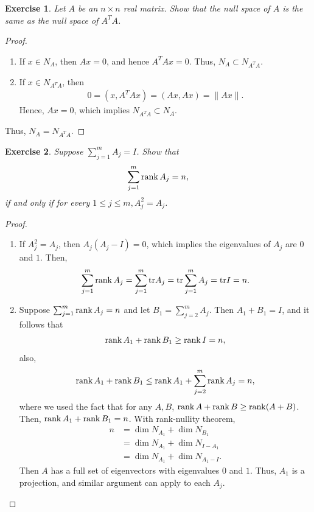 \documentclass[11pt]{book}
\newtheorem{exercise}{Exercise}[section]
\theoremstyle{definition}
\numberwithin{equation}{chapter}
\begin{document}
\medskip

\begin{exercise}
Let $A$ be an $n \times n$ real matrix. Show that the null space of $A$ is the same
as the null space of $A^T A$.
\end{exercise}
\begin{proof}
~\begin{enumerate}[label=(\alph*)]
    \item If $x \in N_A$, then $Ax = 0$, and hence $A^TAx = 0$. Thus, $N_A \subset N_{A^TA}$.
    
    \item If $x \in N_{A^TA}$, then
    \begin{align*}
        0 = \left(x, A^TA x\right) = \left(Ax, A x\right)  = \|Ax\|.
    \end{align*}
    Hence, $Ax = 0$, which implies $N_{A^TA} \subset N_A$.
\end{enumerate}
Thus, $N_A = N_{A^TA}$.
\end{proof}

\medskip

\begin{exercise}{\bf *}
Suppose $\sum^m_{j=1} A_j = I$. Show that 
\begin{align*}
    \sum^m_{j=1} \rank A_j = n,
\end{align*}
if and only if for every $1 \leq j \leq m, A_j^2 = A_j$.
\end{exercise}
\begin{proof}
~\begin{enumerate}[label=(\alph*)]
    \item If $A_j^2 = A_j$, then $A_j \left( A_j - I\right) = 0$, which implies the eigenvalues of $A_j$ are $0$ and $1$. Then,
    \begin{align*}
        \sum^m_{j=1} \rank A_j = \sum^m_{j=1} {\rm tr} A_j = {\rm tr} \sum^m_{j=1} A_j = {\rm tr} I = n.
    \end{align*}
    
    \item Suppose $\sum^m_{j=1} \rank A_j = n$ and let $B_1 = \sum^m_{j=2} A_j$. Then $A_1 + B_1 = I$, and it follows that 
    \begin{align*}
        \rank A_1 + \rank B_1 \geq \rank I = n,
    \end{align*}
    also,
    \begin{align}
        \rank A_1 + \rank B_1 \leq \rank A_1 + \sum^m_{j=2} \rank A_j = n,
    \end{align}
    where we used the fact that for any $A, B$, $\rank A + \rank B \geq \rank (A+B)$. Then, $\rank A_1 + \rank B_1 = n$. With rank-nullity theorem, 
    \begin{align*}
        n & = \dim N_{A_1} + \dim N_{B_1} \\
          & = \dim N_{A_1} + \dim N_{I - A_1} \\
          & = \dim N_{A_1} + \dim N_{A_1 - I}.
    \end{align*}
    Then $A$ has a full set of eigenvectors with eigenvalues $0$ and $1$. Thus, $A_1$ is a projection, and similar argument can apply to each $A_j$.
\end{enumerate}
\end{proof}
\end{document}
